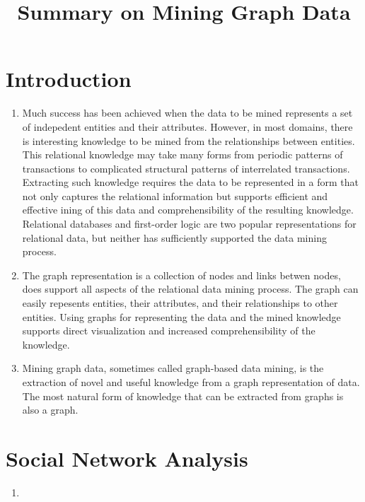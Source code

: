 \documentclass[12pt]{article}
\begin{document}
\title{Summary on Mining Graph Data}
\maketitle

\section{Introduction}
\begin{enumerate}
 \item Much success has been achieved when the data to be mined represents a set of indepedent entities and their attributes. However, in most domains, there is interesting knowledge to be mined from the relationships between entities. This relational knowledge may take many forms from periodic patterns of transactions to complicated structural patterns of interrelated transactions. Extracting such knowledge requires the data to be represented in a form that not only captures the relational information but supports efficient and effective ining of this data and comprehensibility of the resulting knowledge. Relational databases and first-order logic are two popular representations for relational data, but neither has sufficiently supported the data mining process.
 \item The graph representation is a collection of nodes and links betwen nodes, does support all aspects of the relational data mining process. The graph can easily repesents entities, their attributes, and their relationships to other entities. Using graphs for representing the data and the mined knowledge supports direct visualization and increased comprehensibility of the knowledge.
 \item Mining graph data, sometimes called graph-based data mining, is the extraction of novel and useful knowledge from a graph representation of data. The most natural form of knowledge that can be extracted from graphs is also a graph.
\end{enumerate}

\section{Social Network Analysis}
\begin{enumerate}
 \item 
\end{enumerate}
\end{document}
